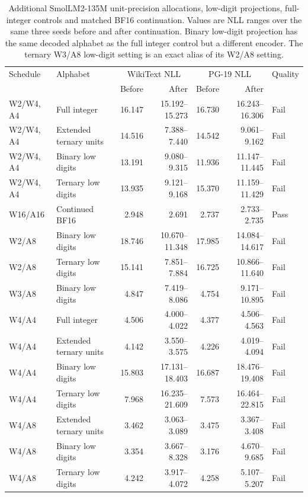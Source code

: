 \documentclass[11pt]{article}
\begin{document}
\begin{table}[p]
\centering\scriptsize
\setlength{\tabcolsep}{3.5pt}
\caption{Additional SmolLM2-135M unit-precision allocations, low-digit projections, full-integer controls and matched BF16 continuation. Values are NLL ranges over the same three seeds before and after continuation. Binary low-digit projection has the same decoded alphabet as the full integer control but a different encoder. The ternary W3/A8 low-digit setting is an exact alias of its W2/A8 setting.}
\label{tab:low-precision-projection}
\begin{tabular}{llrrrrl}
\toprule
Schedule & Alphabet & \multicolumn{2}{c}{WikiText NLL} & \multicolumn{2}{c}{PG-19 NLL} & Quality\\
& & Before & After & Before & After & \\
\midrule
W2/W4, A4 & Full integer & 16.147 & 15.192--15.273 & 16.730 & 16.243--16.306 & Fail \\
W2/W4, A4 & Extended ternary units & 14.516 & 7.388--7.440 & 14.542 & 9.061--9.162 & Fail \\
W2/W4, A4 & Binary low digits & 13.191 & 9.080--9.315 & 11.936 & 11.147--11.445 & Fail \\
W2/W4, A4 & Ternary low digits & 13.935 & 9.121--9.168 & 15.370 & 11.159--11.429 & Fail \\
W16/A16 & Continued BF16 & 2.948 & 2.691 & 2.737 & 2.733--2.735 & Pass \\
W2/A8 & Binary low digits & 18.746 & 10.670--11.348 & 17.985 & 14.084--14.617 & Fail \\
W2/A8 & Ternary low digits & 15.141 & 7.851--7.884 & 16.725 & 10.866--11.640 & Fail \\
W3/A8 & Binary low digits & 4.847 & 7.419--8.086 & 4.754 & 9.171--10.895 & Fail \\
W4/A4 & Full integer & 4.506 & 4.000--4.022 & 4.377 & 4.506--4.563 & Fail \\
W4/A4 & Extended ternary units & 4.142 & 3.550--3.575 & 4.226 & 4.019--4.094 & Fail \\
W4/A4 & Binary low digits & 15.803 & 17.131--18.403 & 16.687 & 18.476--19.408 & Fail \\
W4/A4 & Ternary low digits & 7.968 & 16.235--21.609 & 7.573 & 16.464--22.815 & Fail \\
W4/A8 & Extended ternary units & 3.462 & 3.063--3.089 & 3.475 & 3.367--3.408 & Fail \\
W4/A8 & Binary low digits & 3.354 & 3.667--8.328 & 3.176 & 4.670--9.685 & Fail \\
W4/A8 & Ternary low digits & 4.242 & 3.917--4.072 & 4.258 & 5.107--5.207 & Fail \\
\bottomrule
\end{tabular}
\end{table}
\end{document}
